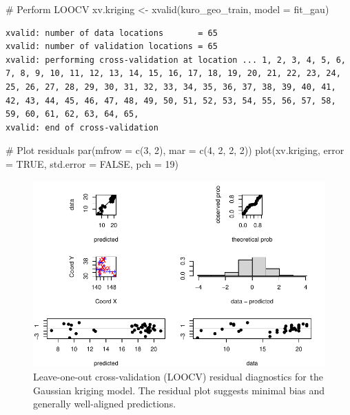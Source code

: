 \documentclass[
  11pt,
]{article}
\newenvironment{Shaded}{\begin{snugshade}}{\end{snugshade}}
\newcommand{\AttributeTok}[1]{\textcolor[rgb]{0.40,0.45,0.13}{#1}}
\newcommand{\CommentTok}[1]{\textcolor[rgb]{0.37,0.37,0.37}{#1}}
\newcommand{\ConstantTok}[1]{\textcolor[rgb]{0.56,0.35,0.01}{#1}}
\newcommand{\DecValTok}[1]{\textcolor[rgb]{0.68,0.00,0.00}{#1}}
\newcommand{\FunctionTok}[1]{\textcolor[rgb]{0.28,0.35,0.67}{#1}}
\newcommand{\NormalTok}[1]{\textcolor[rgb]{0.00,0.23,0.31}{#1}}
\newcommand{\OtherTok}[1]{\textcolor[rgb]{0.00,0.23,0.31}{#1}}
\begin{document}
\begin{Shaded}
\begin{Highlighting}[]
\CommentTok{\# Perform LOOCV}
\NormalTok{xv.kriging }\OtherTok{\textless{}{-}} \FunctionTok{xvalid}\NormalTok{(kuro\_geo\_train, }\AttributeTok{model =}\NormalTok{ fit\_gau)}
\end{Highlighting}
\end{Shaded}

\begin{verbatim}
xvalid: number of data locations       = 65
xvalid: number of validation locations = 65
xvalid: performing cross-validation at location ... 1, 2, 3, 4, 5, 6, 7, 8, 9, 10, 11, 12, 13, 14, 15, 16, 17, 18, 19, 20, 21, 22, 23, 24, 25, 26, 27, 28, 29, 30, 31, 32, 33, 34, 35, 36, 37, 38, 39, 40, 41, 42, 43, 44, 45, 46, 47, 48, 49, 50, 51, 52, 53, 54, 55, 56, 57, 58, 59, 60, 61, 62, 63, 64, 65, 
xvalid: end of cross-validation
\end{verbatim}

\begin{Shaded}
\begin{Highlighting}[]
\CommentTok{\# Plot residuals}
\FunctionTok{par}\NormalTok{(}\AttributeTok{mfrow =} \FunctionTok{c}\NormalTok{(}\DecValTok{3}\NormalTok{, }\DecValTok{2}\NormalTok{), }\AttributeTok{mar =} \FunctionTok{c}\NormalTok{(}\DecValTok{4}\NormalTok{, }\DecValTok{2}\NormalTok{, }\DecValTok{2}\NormalTok{, }\DecValTok{2}\NormalTok{))}
\FunctionTok{plot}\NormalTok{(xv.kriging, }\AttributeTok{error =} \ConstantTok{TRUE}\NormalTok{, }\AttributeTok{std.error =} \ConstantTok{FALSE}\NormalTok{, }\AttributeTok{pch =} \DecValTok{19}\NormalTok{)}
\end{Highlighting}
\end{Shaded}

\begin{figure}[H]

{\centering \includegraphics{project_files/figure-pdf/fig-cvkrig-1.pdf}

}

\caption{Leave-one-out cross-validation (LOOCV) residual diagnostics for
the Gaussian kriging model. The residual plot suggests minimal bias and
generally well-aligned predictions.}

\end{figure}%
\end{document}
